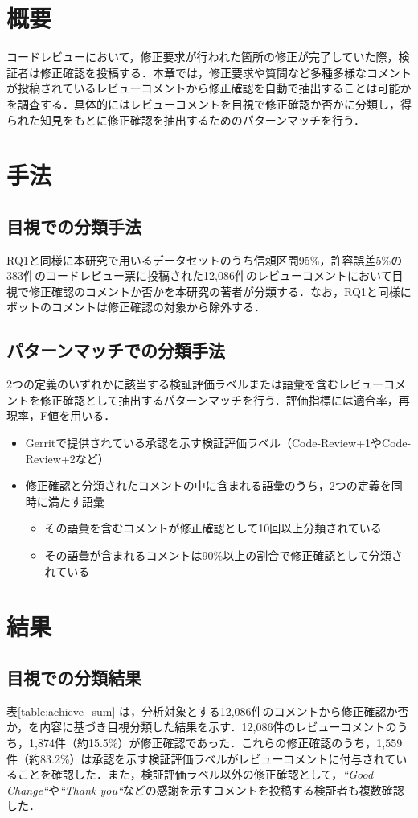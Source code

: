 \documentclass[11pt]{jreport}
\begin{document}
\section{概要}
コードレビューにおいて，修正要求が行われた箇所の修正が完了していた際，検証者は修正確認を投稿する．本章では，修正要求や質問など多種多様なコメントが投稿されているレビューコメントから修正確認を自動で抽出することは可能かを調査する．具体的にはレビューコメントを目視で修正確認か否かに分類し，得られた知見をもとに修正確認を抽出するためのパターンマッチを行う．

\section{手法}
\subsection{目視での分類手法}
RQ1と同様に本研究で用いるデータセットのうち信頼区間95\%，許容誤差5\%の383件のコードレビュー票に投稿された12,086件のレビューコメントにおいて目視で修正確認のコメントか否かを本研究の著者が分類する．なお，RQ1と同様にボットのコメントは修正確認の対象から除外する．

\subsection{パターンマッチでの分類手法}
2つの定義のいずれかに該当する検証評価ラベルまたは語彙を含むレビューコメントを修正確認として抽出するパターンマッチを行う．評価指標には適合率，再現率，F値を用いる．

\begin{itemize}
\item Gerritで提供されている承認を示す検証評価ラベル（Code-Review+1やCode-Review+2など）
\item 修正確認と分類されたコメントの中に含まれる語彙のうち，2つの定義を同時に満たす語彙
\begin{itemize}
    \item その語彙を含むコメントが修正確認として10回以上分類されている
    \item その語彙が含まれるコメントは90\%以上の割合で修正確認として分類されている
\end{itemize}
\end{itemize}

\section{結果}
\subsection{目視での分類結果}
表\ref{table:achieve_sum} は，分析対象とする12,086件のコメントから修正確認か否か，を内容に基づき目視分類した結果を示す．12,086件のレビューコメントのうち，1,874件（約15.5\%）が修正確認であった．これらの修正確認のうち，1,559件（約83.2\%）は承認を示す検証評価ラベルがレビューコメントに付与されていることを確認した．また，検証評価ラベル以外の修正確認として，\textit{``Good Change``}や\textit{``Thank you``}などの感謝を示すコメントを投稿する検証者も複数確認した．
\end{document}
